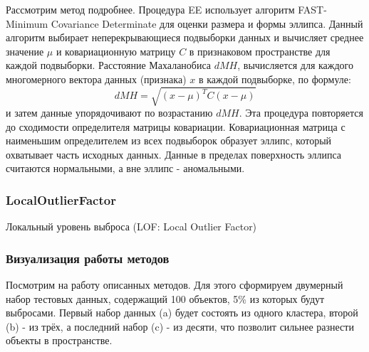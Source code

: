 \documentclass[12pt]{article}
\begin{document}
    \par Рассмотрим метод подробнее. Процедура EE использует алгоритм FAST-Minimum Covariance Determinate для оценки размера и формы эллипса. Данный алгоритм выбирает неперекрывающиеся подвыборки данных и вычисляет среднее значение $\mu$ и ковариационную матрицу $C$ в признаковом пространстве для каждой подвыборки. Расстояние Махаланобиса $dMH$, вычисляется для каждого многомерного вектора данных (признака) $x$ в каждой подвыборке, по формуле:
    $$
    dMH = \sqrt{(x-\mu)^T C (x-\mu)}
    $$
    \noident и затем данные упорядочивают по возрастанию $dMH$. Эта процедура повторяется до сходимости определителя матрицы ковариации. Ковариационная матрица с наименьшим определителем из всех подвыборок образует эллипс, который охватывает часть исходных данных. Данные в пределах поверхность эллипса считаются нормальными, а вне эллипс - аномальными.

    \subsubsection{LocalOutlierFactor}
    \label{sec:Research:Model:LocalOutlierFactor}

    Локальный уровень выброса (LOF: Local Outlier Factor)

    \subsubsection{Визуализация работы методов}
    \label{sec:Research:Model:Visualization}

    Посмотрим на работу описанных методов. Для этого сформируем двумерный набор тестовых данных, содержащий 100 объектов, 5\% из которых будут выбросами. Первый набор данных (a) будет состоять из одного кластера, второй (b) - из трёх, а последний набор (c) - из десяти, что позволит сильнее разнести объекты в пространстве.
\end{document}
